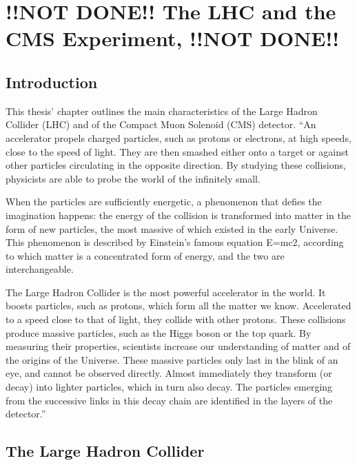 \chapter{!!NOT DONE!! The LHC and the CMS Experiment, !!NOT DONE!!} \label{Chapter2} 


\section{Introduction}
This thesis' chapter outlines the main characteristics of the Large
Hadron Collider (LHC) and of the Compact Muon Solenoid (CMS)
detector. 
``An accelerator propels charged particles, such as protons or electrons, at high speeds, close to the speed of light. They are then smashed either onto a target or against other particles circulating in the opposite direction. By studying these collisions, physicists are able to probe the world of the infinitely small.

When the particles are sufficiently energetic, a phenomenon that
defies the imagination happens: the energy of the collision is
transformed into matter in the form of new particles, the most massive
of which existed in the early Universe. This phenomenon is described
by Einstein’s famous equation E=mc2, according to which matter is a
concentrated form of energy, and the two are interchangeable.

The Large Hadron Collider is the most powerful accelerator in the world. It boosts particles, such as protons, which form all the matter we know. Accelerated to a speed close to that of light, they collide with other protons. These collisions produce massive particles, such as the Higgs boson or the top quark. By measuring their properties, scientists increase our understanding of matter and of the origins of the Universe. These massive particles only last in the blink of an eye, and cannot be observed directly. Almost immediately they transform (or decay) into lighter particles, which in turn also decay. The particles emerging from the successive links in this decay chain are identified in the layers of the detector.''

\section{The Large Hadron Collider}

